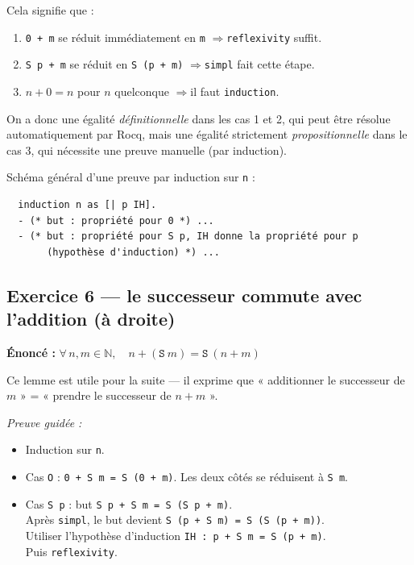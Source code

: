 \documentclass[11pt,a4paper]{article}
\newcommand{\cq}[1]{\texttt{#1}}
\begin{document}
Cela signifie que :
\begin{enumerate}[noitemsep,topsep=2pt]
  \item \cq{0 + m} se réduit immédiatement en \cq{m}
    \quad$\Rightarrow$\quad \cq{reflexivity} suffit.
  \item \cq{S p + m} se réduit en \cq{S (p + m)}
    \quad$\Rightarrow$\quad \cq{simpl} fait cette étape.
  \item $n + 0 = n$ pour $n$ quelconque
    \quad$\Rightarrow$\quad il faut \cq{induction}.
\end{enumerate}

On a donc une égalité \textit{définitionnelle} dans les cas 1 et 2, qui peut
être résolue automatiquement par Rocq, mais une égalité strictement
\textit{propositionnelle} dans le cas 3, qui nécessite une preuve manuelle
(par induction).

\noindent Schéma général d'une preuve par induction sur \cq{n} :

\begin{verbatim}
  induction n as [| p IH].
  - (* but : propriété pour 0 *) ...
  - (* but : propriété pour S p, IH donne la propriété pour p
       (hypothèse d'induction) *) ...
\end{verbatim}

\subsection{Exercice 6 — le successeur commute avec l'addition (à droite)}

\textbf{Énoncé :} $\forall\, n, m \in \mathbb{N},\quad n + (\mathtt{S}\ m) = \mathtt{S}\ (n+m)$

Ce lemme est utile pour la suite — il exprime que
« additionner le successeur de $m$ » = « prendre le successeur de $n + m$ ».

\textit{Preuve guidée :}
\begin{itemize}[noitemsep,topsep=2pt]
  \item Induction sur \cq{n}.
  \item Cas \cq{O} : \cq{0 + S m = S (0 + m)}.
    Les deux côtés se réduisent à \cq{S m}.
  \item Cas \cq{S p} : but \cq{S p + S m = S (S p + m)}.\\
    Après \cq{simpl}, le but devient \cq{S (p + S m) = S (S (p + m))}.\\
    Utiliser l'hypothèse d'induction \cq{IH : p + S m = S (p + m)}.\\
    Puis \cq{reflexivity}.
\end{itemize}
\end{document}
